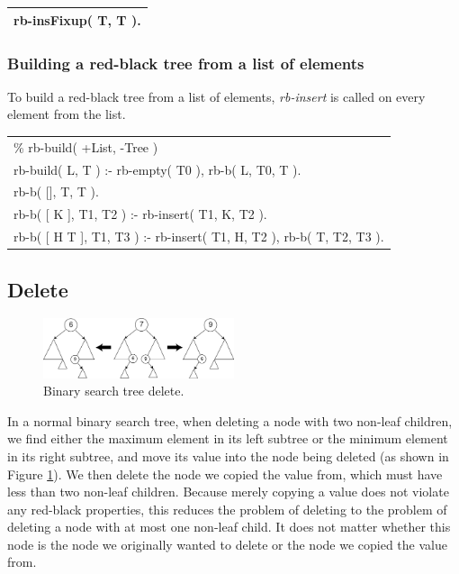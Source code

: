 \documentclass{article}
\newenvironment{code}{\obeycr\begin{it}\nopagebreak\addvspace{1ex}\noindent\footnotesize\begin{tabular}{|p{0.95\textwidth}|}\hline}{\\\hline\end{tabular}\par\addvspace{1ex}\end{it}\restorecr}
\newcommand{\inlinecode}[1]{\textit{#1}}
\begin{document}
\begin{code}
rb-insFixup( T, T ).
\end{code}

\subsubsection[\inlinecode{rb-build}]{Building a red-black tree from a list of elements}
To build a red-black tree from a list of elements, \inlinecode{rb-insert} is called on every element from the list.

\begin{code}
\% rb-build( +List, -Tree )\\
rb-build( L, T ) :-
\hspace{2ex}rb-empty( T0 ),
\hspace{2ex}rb-b( L, T0, T ).\\
rb-b( [], T, T ).\\
rb-b( [ K ], T1, T2 ) :-
\hspace{2ex}rb-insert( T1, K, T2 ).\\
rb-b( [ H \textbar T ], T1, T3 ) :-
\hspace{2ex}rb-insert( T1, H, T2 ),
\hspace{2ex}rb-b( T, T2, T3 ).
\end{code}

\newpage
\subsection{Delete}
\begin{figure}
  \includegraphics[width=0.5\textwidth]{Binary_search_tree_delete}
  \caption{Binary search tree delete.}
  \label{bstDel}
\end{figure}
In a normal binary search tree, when deleting a node with two non-leaf children, we find either the maximum element in its left subtree or the minimum element in its right subtree, and move its value into the node being deleted (as shown in Figure \ref{bstDel}). We then delete the node we copied the value from, which must have less than two non-leaf children. Because merely copying a value does not violate any red-black properties, this reduces the problem of deleting to the problem of deleting a node with at most one non-leaf child. It does not matter whether this node is the node we originally wanted to delete or the node we copied the value from.
\end{document}
